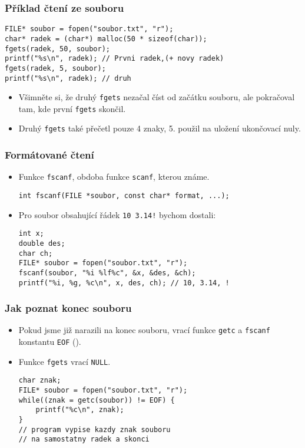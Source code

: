 \documentclass{beamer}
\newenvironment{itemizex}%
  {\large \begin{itemize}%
    \setlength{\itemsep}{8pt}%
    \setlength{\parskip}{8pt}}%
  {\end{itemize}}
\begin{document}
\begin{frame}[t,fragile]\frametitle{Příklad čtení ze souboru} 
\begin{verbatim} 
FILE* soubor = fopen("soubor.txt", "r");
char* radek = (char*) malloc(50 * sizeof(char));
fgets(radek, 50, soubor);
printf("%s\n", radek); // Prvni radek,(+ novy radek)
fgets(radek, 5, soubor);
printf("%s\n", radek); // druh
\end{verbatim}


\begin{itemizex}
    \item Všimněte si, že druhý \texttt{fgets} nezačal číst od začátku souboru, ale pokračoval tam, kde první \texttt{fgets} skončil. 
    \item Druhý \texttt{fgets} také přečetl pouze 4 znaky, 5. použil na uložení ukončovací nuly. 
\end{itemizex}
\end{frame}



\begin{frame}[t,fragile]\frametitle{Formátované čtení} 
    \begin{itemizex}
        \item Funkce \texttt{fscanf}, obdoba funkce \texttt{scanf}, kterou známe. 
\begin{verbatim} 
int fscanf(FILE *soubor, const char* format, ...);
\end{verbatim}
        \item Pro soubor obsahující řádek \texttt{10 3.14!} bychom dostali:
\begin{verbatim} 
int x;
double des;
char ch;
FILE* soubor = fopen("soubor.txt", "r");
fscanf(soubor, "%i %lf%c", &x, &des, &ch);
printf("%i, %g, %c\n", x, des, ch); // 10, 3.14, !
\end{verbatim}
    \end{itemizex}
\end{frame}


\begin{frame}[t,fragile]\frametitle{Jak poznat konec souboru} 
    \begin{itemizex}
        \item Pokud jsme již narazili na konec souboru, vrací funkce \texttt{getc} a \texttt{fscanf} konstantu \texttt{EOF} ().
        \item Funkce \texttt{fgets} vrací \texttt{NULL}.
\begin{verbatim} 
char znak;
FILE* soubor = fopen("soubor.txt", "r");
while((znak = getc(soubor)) != EOF) {
    printf("%c\n", znak);
}
// program vypise kazdy znak souboru 
// na samostatny radek a skonci
\end{verbatim}
    \end{itemizex}
\end{frame}
\end{document}
